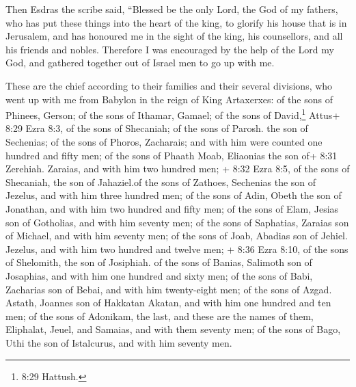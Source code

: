  Then Esdras the scribe said, ``Blessed be the only Lord,
the God of my fathers, who has put these things into the heart of the
king, to glorify his house that is in Jerusalem,  and has
honoured me in the sight of the king, his counsellors, and all his
friends and nobles.  Therefore I was encouraged by the help
of the Lord my God, and gathered together out of Israel men to go up
with me.

 These are the chief according to their families and their
several divisions, who went up with me from Babylon in the reign of King
Artaxerxes:  of the sons of Phinees, Gerson; of the sons of
Ithamar, Gamael; of the sons of David,\footnote{8:29 Hattush.} Attus+
8:29 Ezra 8:3, of the sons of Shecaniah; of the sons of Parosh. the son
of Sechenias;  of the sons of Phoros, Zacharais; and with
him were counted one hundred and fifty men;  of the sons of
Phaath Moab, Eliaonias the son of+ 8:31 Zerehiah. Zaraias, and with him
two hundred men;  + 8:32 Ezra 8:5, of the sons of
Shecaniah, the son of Jahaziel.of the sons of Zathoes, Sechenias the son
of Jezelus, and with him three hundred men; of the sons of Adin, Obeth
the son of Jonathan, and with him two hundred and fifty men;
 of the sons of Elam, Jesias son of Gotholias, and with him
seventy men;  of the sons of Saphatias, Zaraias son of
Michael, and with him seventy men;  of the sons of Joab,
Abadias son of Jehiel. Jezelus, and with him two hundred and twelve men;
 + 8:36 Ezra 8:10, of the sons of Shelomith, the son of
Josiphiah. of the sons of Banias, Salimoth son of Josaphias, and with
him one hundred and sixty men;  of the sons of Babi,
Zacharias son of Bebai, and with him twenty-eight men;  of
the sons of Azgad. Astath, Joannes son of Hakkatan Akatan, and with him
one hundred and ten men;  of the sons of Adonikam, the
last, and these are the names of them, Eliphalat, Jeuel, and Samaias,
and with them seventy men;  of the sons of Bago, Uthi the
son of Istalcurus, and with him seventy men.

